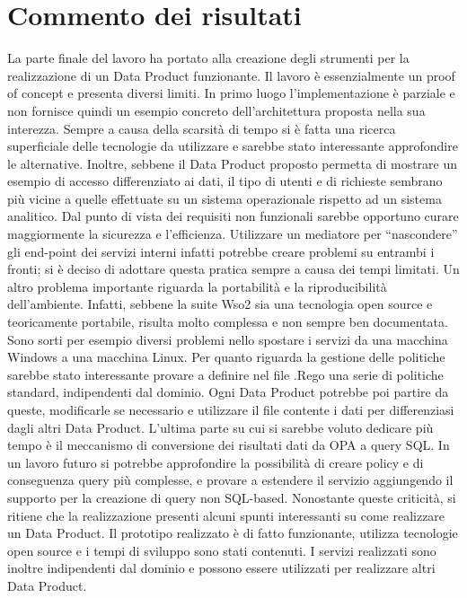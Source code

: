 \documentclass[12pt]{report}
\begin{document}
\section{Commento dei risultati}\label{commento risultati}
La parte finale del lavoro ha portato alla creazione degli strumenti per la realizzazione di un Data Product funzionante.
Il lavoro è essenzialmente un proof of concept e presenta diversi limiti.
In primo luogo l'implementazione è parziale e non fornisce quindi un esempio concreto dell'architettura proposta nella sua interezza.
Sempre a causa della scarsità di tempo si è fatta una ricerca superficiale delle tecnologie da utilizzare e sarebbe stato interessante approfondire le alternative.
Inoltre, sebbene il Data Product proposto permetta di mostrare un esempio di accesso differenziato ai dati, il tipo di utenti e di richieste sembrano più vicine a quelle effettuate su un sistema operazionale rispetto ad un sistema analitico.
Dal punto di vista dei requisiti non funzionali sarebbe opportuno curare maggiormente la sicurezza e l'efficienza. 
Utilizzare un mediatore per ``nascondere'' gli end-point dei servizi interni infatti potrebbe creare problemi su entrambi i fronti; si è deciso di adottare questa pratica sempre a causa dei tempi limitati.
Un altro problema importante riguarda la portabilità e la riproducibilità dell'ambiente. 
Infatti, sebbene la suite Wso2 sia una tecnologia open source e teoricamente portabile, risulta molto complessa e non sempre ben documentata. 
Sono sorti per esempio diversi problemi nello spostare i servizi da una macchina Windows a una macchina Linux.
Per quanto riguarda la gestione delle politiche sarebbe stato interessante provare a definire nel file .Rego una serie di politiche standard, indipendenti dal dominio.
Ogni Data Product potrebbe poi partire da queste, modificarle se necessario e utilizzare il file contente i dati per differenziasi dagli altri Data Product.
L'ultima parte su cui si sarebbe voluto dedicare più tempo è il meccanismo di conversione dei risultati dati da OPA a query SQL.
In un lavoro futuro si potrebbe approfondire la possibilità di creare policy e di conseguenza query più complesse, e provare a estendere il servizio aggiungendo il supporto per la creazione di query non SQL-based.
Nonostante queste criticità, si ritiene che la realizzazione presenti alcuni spunti interessanti su come realizzare un Data Product.
Il prototipo realizzato è di fatto funzionante, utilizza tecnologie open source e i tempi di sviluppo sono stati contenuti.
I servizi realizzati sono inoltre indipendenti dal dominio e possono essere utilizzati per realizzare altri Data Product.
\end{document}

